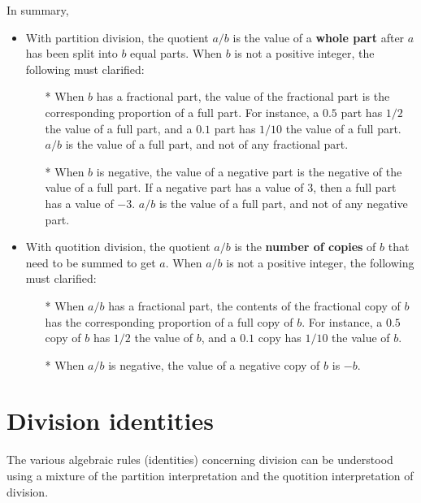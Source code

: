 \documentclass{article}
\begin{document}
In summary, 
\begin{itemize}
\item With partition division, the quotient \(a/b\) is the value of a {\bf whole part} after \(a\) has been split into \(b\) equal parts. When \(b\) is not a positive integer, the following must clarified: 
\begin{itemize}
\item[*] When \(b\) has a fractional part, the value of the fractional part is the corresponding proportion of a full part. For instance, a \(0.5\) part has \(1/2\) the value of a full part, and a \(0.1\) part has \(1/10\) the value of a full part. \(a/b\) is the value of a full part, and not of any fractional part. 
\item[*] When \(b\) is negative, the value of a negative part is the negative of the value of a full part. If a negative part has a value of \(3\), then a full part has a value of  \(-3\). \(a/b\) is the value of a full part, and not of any negative part. 
\end{itemize}
\item With quotition division, the quotient \(a/b\) is the {\bf number of copies} of \(b\) that need to be summed to get \(a\). When \(a/b\) is not a positive integer, the following must clarified: 
\begin{itemize}
\item[*] When \(a/b\) has a fractional part, the contents of the fractional copy of \(b\) has the corresponding proportion of a full copy of \(b\). For instance, a \(0.5\) copy of \(b\) has \(1/2\) the value of \(b\), and a \(0.1\) copy has \(1/10\) the value of \(b\).
\item[*] When \(a/b\) is negative, the value of a negative copy of \(b\) is \(-b\).
\end{itemize}
\end{itemize}





\section*{Division identities}

The various algebraic rules (identities) concerning division can be understood using a mixture of the partition interpretation and the quotition interpretation of division.

\end{document}
